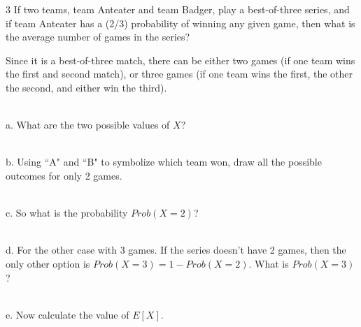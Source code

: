 \documentclass[a4paper,12pt]{book}
\newcounter{question}
\begin{document}
	\newpage
        \begin{question}{\thequestion}{3}
	    If two teams, team Anteater and team Badger, play a
	    best-of-three series, and if team Anteater has a (2/3)
	    probability of winning any given game, then what is the
	    average number of games in the series?

	    Since it is a best-of-three match, there can be either
	    two games (if one team wins the first and second match),
	    or three games (if one team wins the first, the other the second, and either win the third).

	    ~\\
	    a. What are the two possible values of $X$?

	    ~\\
	    b. Using ``A" and ``B" to symbolize which team won,
	    draw all the possible outcomes for only 2 games.

	    ~\\
	    c. So what is the probability $Prob(X = 2)$?

	    ~\\
	    d. For the other case with 3 games. If the series
	    doesn't have 2 games, then the only other option is
	    $Prob(X = 3) = 1 - Prob(X=2)$. What is $Prob(X=3)$?

	    ~\\
	    e. Now calculate the value of $E[X]$.

	\end{question}
\end{document}
